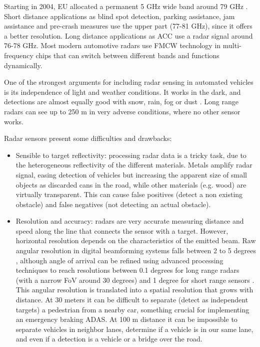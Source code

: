 Starting in 2004, EU allocated a permanent 5 GHz wide band around 79 GHz
\cite{EULawandPublications2004}. Short distance applications as blind spot
detection, parking assistance, jam assistance and pre-crash measures use the 
upper part (77-81 GHz), since it offers a better resolution. Long distance 
applications as ACC use a radar signal around 76-78 GHz. 
Most modern automotive radars use FMCW technology in multi-frequency chips that 
can switch between different bands and functions dynamically.

One of the strongest arguments for including radar sensing in automated 
vehicles is its independence of light and weather conditions. 
It works in the dark, and detections are almost equally good with snow, 
rain, fog or dust \cite{Reina2015}. Long range radars can see up to 250 m
in very adverse conditions, where no other sensor works.

Radar sensors present some difficulties and drawbacks:

\begin{itemize}
    \item Sensible to target reflectivity: processing radar data is a tricky
    task, due to the heterogeneous reflectivity of the different materials. 
    Metals amplify radar signal, easing detection of vehicles but increasing
    the apparent size of small objects as discarded cans in the road, while 
    other materials (e.g. wood) are virtually transparent.
    This can cause false positives (detect a non existing obstacle) and false
    negatives (not detecting an actual obstacle).
    
    \item Resolution and accuracy: radars are very accurate measuring distance
    and speed along the line that connects the sensor with a target. However, 
    horizontal resolution depends on the characteristics of the emitted beam.
    Raw angular resolution in digital beamforming systems falls between 2 to 5
    degrees \cite{Schneider2005}, although angle of arrival can be refined
    using advanced processing techniques to reach resolutions between 0.1
    degrees for long range radars (with a narrow FoV around 30 degrees) and 1
    degree for short range sensors \cite{Kissinger2012}. 
    This angular resolution is translated into a spatial resolution that grows
    with distance. At 30 meters it can be difficult to separate (detect as
    independent targets) a pedestrian from a nearby car, something crucial for
    implementing an emergency braking ADAS. 
    At 100 m distance it can be impossible to separate vehicles in neighbor
    lanes, determine if a vehicle is in our same lane, and even if a detection
    is a vehicle or a bridge over the road.
\end{itemize}

